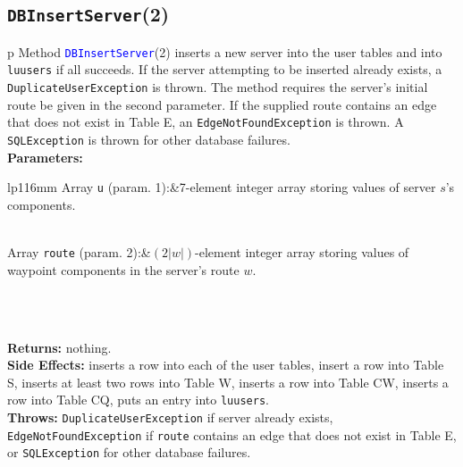 \subsection{\texttt{DBInsertServer}(2)}
\begin{tabular}{p{\textwidth}}
\toprule
{}
Method \textcolor{blue}{{\tt{}DBInsertServer}}(2) inserts a new server into the
user tables and into {\tt{}lu{}users} if all succeeds.  If the server attempting to
be inserted already exists, a {\tt{}DuplicateUserException} is thrown. The method
requires the server's initial route be given in the second parameter. If the
supplied route contains an edge that does not exist in Table E, an
{\tt{}EdgeNotFoundException} is thrown. A {\tt{}SQLException} is thrown for other
database failures.\\
\midrule
\textbf{Parameters:} \\
\begin{tabular}{lp{116mm}}
Array {\tt{}u} (param. 1):&7-element integer array storing values of
server $s$'s components.

\\
Array {\tt{}route} (param. 2):&$(2|w|)$-element integer array storing values of
waypoint components in the server's route $w$.

\\
\end{tabular}\\
\textbf{Returns:} nothing.\\
\textbf{Side Effects:} inserts a row into each of the user tables, insert a
row into Table S, inserts at least two rows into Table W, inserts a row into Table CW,
inserts a row into Table CQ, puts an entry into {\tt{}lu{}users}.\\
\textbf{Throws:} {\tt{}DuplicateUserException} if server already exists,
{\tt{}EdgeNotFoundException} if {\tt{}route} contains an edge that does not exist
in Table E, or {\tt{}SQLException} for other database failures.\\
\bottomrule
\end{tabular}
